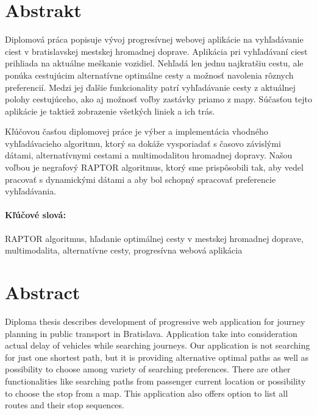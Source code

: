 \documentclass[12pt, oneside]{book}
\begin{document}

\newpage 
\section*{Abstrakt}
Diplomová práca popisuje vývoj progresívnej webovej aplikácie na vyhľadávanie ciest v bratislavskej mestskej hromadnej doprave. Aplikácia pri vyhľadávaní ciest prihliada na aktuálne meškanie vozidiel. Nehľadá len jednu najkratšiu cestu, ale ponúka cestujúcim alternatívne optimálne cesty a možnosť navolenia rôznych preferencií. Medzi jej ďalšie funkcionality patrí vyhľadávanie cesty z aktuálnej polohy cestujúceho, ako aj možnosť voľby zastávky priamo z mapy. Súčasťou tejto aplikácie je taktiež zobrazenie všetkých liniek a ich trás.

Kľúčovou časťou diplomovej práce je výber a implementácia vhodného vyhľadávacieho algoritmu, ktorý sa dokáže vysporiadať s časovo závislými dátami, alternatívnymi cestami a multimodalitou hromadnej dopravy. 
Našou voľbou je negrafový RAPTOR algoritmus, ktorý sme prispôsobili tak, aby vedel pracovať s dynamickými dátami a aby bol schopný spracovať preferencie vyhľadávania.

\paragraph*{Kľúčové slová:} 
RAPTOR algoritmus, hľadanie optimálnej cesty v mestskej hromadnej doprave, multimodalita, alternatívne cesty, progresívna webová aplikácia


\newpage 
\section*{Abstract}
Diploma thesis describes development of progressive web application for journey planning in public transport in Bratislava. Application take into consideration actual delay of vehicles while searching journeys. Our application is not searching for just one shortest path, but it is providing alternative optimal paths as well as possibility to choose among variety of searching preferences. There are other functionalities like searching paths from passenger current location or possibility to choose the stop from a map. This application also offers option to list all routes and their stop sequences.
\end{document}
